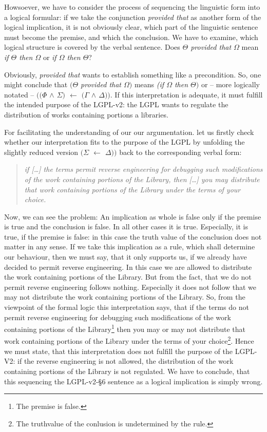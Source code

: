 Howsoever, we have to consider the process of sequencing the linguistic form
into a logical formular: if we take the conjunction \emph{provided that} as
another form of the logical implication, it is not obviously clear, which part
of the  linguistic sentence must become the premise, and which the conclusion.
We have to examine, which logical structure is covered by the verbal sentence.
Does \emph{$\Theta$ provided that $\Omega$} mean \emph{if $\Theta$ then
$\Omega$} or \emph{if $\Omega$ then $\Theta$}?

Obviously, \emph{provided that} wants to establish something like a
precondition. So, one might conclude that \emph{$(\Theta$ provided that
$\Omega)$} means \emph{(if $\Omega$ then $\Theta)$} or -- more logically notated
-- \emph{$((\Phi$ $\wedge$ $\Sigma)$ $\leftarrow$ $(\Gamma$ $\wedge$
$\Delta))$}. If this interpretation is adequate, it must fulfill the intended
purpose of the LGPL-v2: the LGPL wants to regulate the distribution of works
containing portions a libraries. 

For facilitating the understanding of our our argumentation. let us firstly
check whether our interpretation fits to the purpose of the LGPL by unfolding
the slightly reduced version \emph{$(\Sigma$ $\leftarrow$ $\Delta))$} back to
the corresponding verbal form:

\begin{quote}\noindent\emph{if [\ldots] the terms permit reverse engineering for
debugging such modifications of the work containing portions of the Library,
then [\ldots] you may distribute that work containing portions of the Library
under the terms of your choice.}\end{quote}

Now, we can see the problem: An implication as whole is false only if the
premise is true and the conclusion is false. In all other cases it is true.
Especially, it is true, if the premise is false: in this case the truth value of
the conclusion does not matter in any sense. If we take this implication as a
rule, which shall determine our behaviour, then we must say, that it only
supports us, if we already have decided to permit reverse engineering. In this
case we are allowed to distribute the work containing portions of the Library.
But from the fact, that we do not permit reverse engineering follows nothing.
Especially it does not follow that we may not distribute the work containing
portions of the Library. So, from the viewpoint of the formal logic this
interpretation says, that if the terms do not permit reverse engineering for
debugging such modifications of the work containing portions of the
Library\footnote{The premise is false.} then you may or may not distribute that
work containing portions of the Library under the terms of your
choice\footnote{The truthvalue of the conlusion is undetermined by the rule.}.
Hence we must state, that this interpretation does not fulfill the purpose of
the LGPL-V2: if the reverse engineering is not allowed, the distribution of the
work containing portions of the Library is not regulated. We have to conclude,
that this sequencing the LGPL-v2-§6 sentence as a logical implication is simply
wrong.

